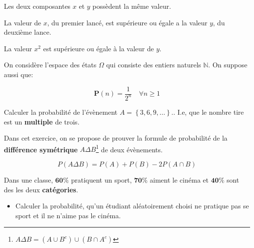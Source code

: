 \documentclass[10pt,largemargins]{homework}
\begin{document}
\begin{arabicparts}
    \item Les deux composantes $x$ et $y$ possèdent la même valeur.
    \item La valeur de $x$, du premier lancé, est supérieure ou
        égale
        a la valeur $y$, du deuxième lance.
    \item La valeur $x^2$ est supérieure ou égale à la valeur de $y$.
\end{arabicparts}



On considère l'espace des états $\Omega$ qui consiste des entiers naturels
$\mathbb{N}$. On suppose aussi que:

\begin{equation}
    \mathbf{P}(n) = \dfrac{1}{2^n}\quad \forall n \geq 1
\end{equation}

      Calculer la probabilité de l'évènement
        $A = \left\{3,6,9,\ldots\right\}.$. I.e, que le nombre tire
        est un \textbf{multiple} de trois.

Dans cet exercice, on se propose de prouver la formule de probabilité de
la \textbf{différence symétrique} $A\Delta B$\footnote{$A\Delta B = (A\cup B^c) \cup (B \cap
A^c)$} de deux évènements.

\begin{equation}
   P(A \Delta B) = P(A) + P(B) - 2 P(A\cap B) 
\end{equation}


Dans une classe, $\mathbf{60\%}$ pratiquent un sport, $\mathbf{70\%}$
aiment le cinéma et $\mathbf{40\%}$ sont des les deux \textbf{catégories}.

\begin{itemize}
    \item Calculer la probabilité, qu'un étudiant aléatoirement
        choisi ne pratique pas se sport et il ne n'aime pas le cinéma.
\end{itemize}

\end{document}
